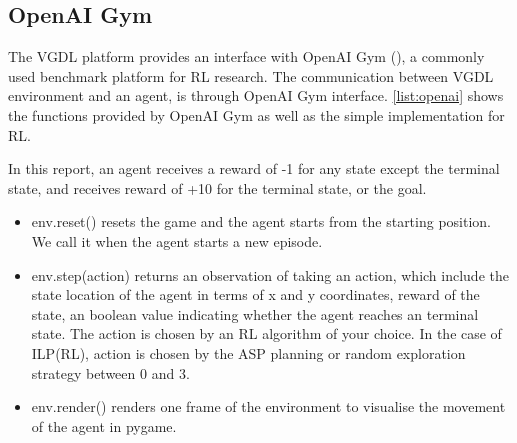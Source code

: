 \subsection{OpenAI Gym}
\label{sebseq:openai_gym}
The VGDL platform provides an interface with OpenAI Gym (\cite{Brockman2016}), a commonly used benchmark platform for RL research.
The communication between VGDL environment and an agent, is through OpenAI Gym interface. 
\ref{list:openai} shows the functions provided by OpenAI Gym as well as the simple implementation for RL. 

In this report, an agent receives a reward of -1 for any state except the terminal state, and receives reward of +10 for the terminal state, or the goal.




\begin{itemize}
\item \textsf{env.reset()} resets the game and the agent starts from the starting position. We call it when the agent starts a new episode.
\item \textsf{env.step(action)} returns an observation of taking an action, which include the state location of the agent in terms of x and y coordinates, reward of the state, an boolean value indicating whether the agent reaches an terminal state.
The action is chosen by an RL algorithm of your choice. In the case of ILP(RL), action is chosen by the ASP planning or random exploration strategy between 0 and 3.
\item \textsf{env.render()} renders one frame of the environment to visualise the movement of the agent in pygame.
\end{itemize}
